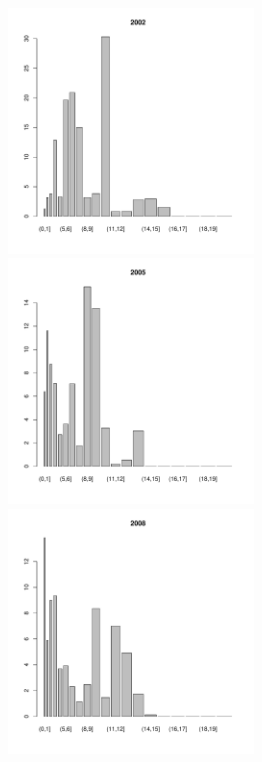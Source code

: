 \documentclass[12pt, a4paper]{article}
\begin{document}
\begin{figure}[h]
\begin{multicols}{3}
\hfill
\includegraphics[width=65mm]{../White_Sea/Estuatiy_Luvenga/sizestr_percents_2002_.pdf}
\hfill
\includegraphics[width=65mm]{../White_Sea/Estuatiy_Luvenga/sizestr_percents_2005_.pdf}
\hfill
\includegraphics[width=65mm]{../White_Sea/Estuatiy_Luvenga/sizestr_percents_2008_.pdf}
\end{multicols}




\end{figure}
\end{document}
